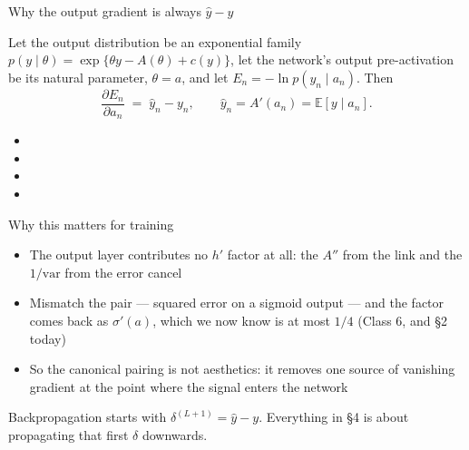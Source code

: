 \documentclass[aspectratio=169, 11pt]{beamer}
\newcommand{\src}[3]{}      %
\newcommand{\nosrc}{}       %
\begin{document}
\begin{frame}{Why the output gradient is always $\hat y - y$}
  \src{bishop2024}{equation}{5.95}
  \src{bishop2024}{section}{5.4.6}
  \vspace{0.05em}
  \begin{theorem}
    {\small Let the output distribution be an exponential family
    $p(y\mid\theta)=\exp\{\theta y - A(\theta) + c(y)\}$, let the
    network's output pre-activation be its natural parameter,
    $\theta = a$, and let $E_n=-\ln p(y_n\mid a_n)$. Then
    \[
      \frac{\partial E_n}{\partial a_n} \;=\; \hat y_n - y_n,
      \qquad \hat y_n = A'(a_n) = \mathbb{E}[y\mid a_n].
    \]}
  \end{theorem}
  \vspace{-0.05em}
  {\footnotesize
  \begin{itemize}\setlength{\itemsep}{0pt}
    \item {}
    \item {}
    \item {}
    \item {}
  \end{itemize}}
\end{frame}

\begin{frame}{Why this matters for training}
  \nosrc
  \vspace{0.3em}
  {\small
  \begin{itemize}\setlength{\itemsep}{5pt}
    \item The output layer contributes \alert{no $h'$ factor at all}:
          the $A''$ from the link and the $1/\mathrm{var}$ from the
          error cancel
    \item Mismatch the pair --- squared error on a sigmoid output ---
          and the factor comes back as $\sigma'(a)$, which we now know
          is at most $1/4$ (Class 6, and \S2 today)
    \item So the canonical pairing is not aesthetics: it removes one
          source of vanishing gradient at the point where the signal
          enters the network
  \end{itemize}}
  \vspace{0.4em}
  \begin{redhighlight}
    {\small Backpropagation starts with $\delta^{(L+1)}=\hat y - y$.
    Everything in \S4 is about propagating that first $\delta$
    downwards.}
  \end{redhighlight}
\end{frame}
\end{document}
